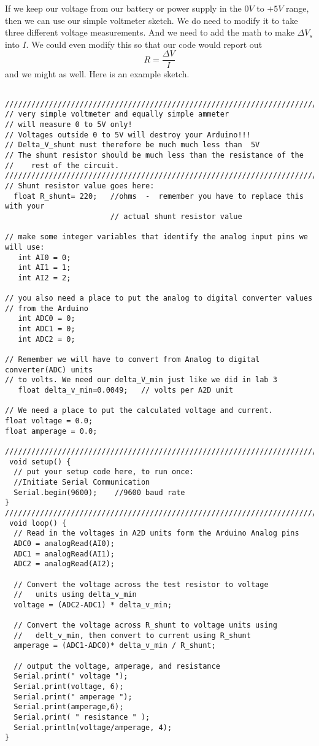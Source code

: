 If we keep our voltage from our battery or power supply in the $0\unit{V}$
to $+5\unit{V}$ range, then we can use our simple voltmeter sketch. We do
need to modify it to take three different voltage measurements. And we need
to add the math to make $\Delta V_{s}$ into $I.$ We could even modify this
so that our code would report out 
\begin{equation*}
R=\frac{\Delta V}{I}
\end{equation*}%
and we might as well. Here is an example sketch.
\begin{verbatim}
 ////////////////////////////////////////////////////////////////////////////
// very simple voltmeter and equally simple ammeter
// will measure 0 to 5V only!
// Voltages outside 0 to 5V will destroy your Arduino!!!
// Delta_V_shunt must therefore be much much less than  5V
// The shunt resistor should be much less than the resistance of the
//    rest of the circuit.
////////////////////////////////////////////////////////////////////////////
// Shunt resistor value goes here:
  float R_shunt= 220;   //ohms  -  remember you have to replace this with your 
                        // actual shunt resistor value
 
// make some integer variables that identify the analog input pins we will use:
   int AI0 = 0;
   int AI1 = 1;
   int AI2 = 2;
 
// you also need a place to put the analog to digital converter values 
// from the Arduino
   int ADC0 = 0;
   int ADC1 = 0;
   int ADC2 = 0;
 
// Remember we will have to convert from Analog to digital converter(ADC) units
// to volts. We need our delta_V_min just like we did in lab 3 
   float delta_v_min=0.0049;   // volts per A2D unit
  
// We need a place to put the calculated voltage and current.
float voltage = 0.0;
float amperage = 0.0;
 
////////////////////////////////////////////////////////////////////////////
 void setup() {
  // put your setup code here, to run once:
  //Initiate Serial Communication
  Serial.begin(9600);    //9600 baud rate
}
////////////////////////////////////////////////////////////////////////////
 void loop() {
  // Read in the voltages in A2D units form the Arduino Analog pins
  ADC0 = analogRead(AI0); 
  ADC1 = analogRead(AI1);
  ADC2 = analogRead(AI2);
  
  // Convert the voltage across the test resistor to voltage 
  //   units using delta_v_min
  voltage = (ADC2-ADC1) * delta_v_min;
 
  // Convert the voltage across R_shunt to voltage units using 
  //   delt_v_min, then convert to current using R_shunt
  amperage = (ADC1-ADC0)* delta_v_min / R_shunt;
 
  // output the voltage, amperage, and resistance
  Serial.print(" voltage ");
  Serial.print(voltage, 6);  
  Serial.print(" amperage ");
  Serial.print(amperage,6);
  Serial.print( " resistance " );
  Serial.println(voltage/amperage, 4);
}
\end{verbatim}

